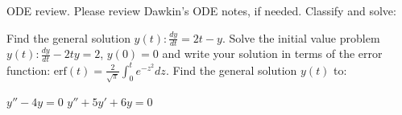 \documentclass[
	number={3},
	title={}
]{math486homework}
\begin{document}
\begin{problems}
\begin{problems}
	\end{problems}
	\problem ODE review.
	Please review Dawkin's ODE notes, if needed.
	Classify and solve:
	\begin{problems}
		\subproblem Find the general solution $y(t): \frac{dy}{dt} = 2t - y$. 
		\subproblem Solve the initial value problem $y(t): \frac{dy}{dt} - 2ty = 2$, $y(0) = 0$ and write your solution in terms of the error function: $\mbox{erf}(t) = \frac{2}{\sqrt{\pi}}\int_{0}^{t} e^{-z^{2}} dz$. 
		\subproblem Find the general solution $y(t)$ to:
		\begin{problems}
			\subsubproblem $y'' - 4y = 0$ 
			\subsubproblem $y'' + 5y' + 6y = 0$ 
		\end{problems}
	\end{problems}
\end{problems}
\end{document}
